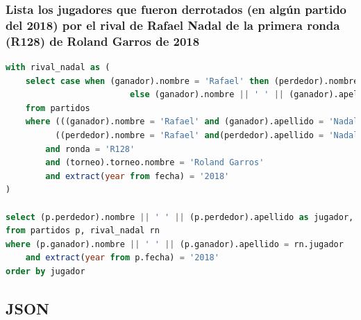 \documentclass[10pt]{opticajnl}
\begin{document}
\subsubsection{Lista los jugadores que fueron derrotados (en algún partido del 2018) por el rival de Rafael Nadal de la primera ronda (R128) de Roland Garros de 2018}

\begin{lstlisting}[language=SQL]
with rival_nadal as (
	select case when (ganador).nombre = 'Rafael' then (perdedor).nombre || ' ' || (perdedor).apellido 
						 else (ganador).nombre || ' ' || (ganador).apellido end as jugador
	from partidos 
	where (((ganador).nombre = 'Rafael' and (ganador).apellido = 'Nadal') or 
		  ((perdedor).nombre = 'Rafael' and(perdedor).apellido = 'Nadal'))
		and ronda = 'R128'
		and (torneo).torneo.nombre = 'Roland Garros'
		and extract(year from fecha) = '2018'
)

select (p.perdedor).nombre || ' ' || (p.perdedor).apellido as jugador, (p.perdedor).pais.codigo_iso2 as pais
from partidos p, rival_nadal rn
where (p.ganador).nombre || ' ' || (p.ganador).apellido = rn.jugador
	and extract(year from p.fecha) = '2018'
order by jugador
\end{lstlisting}


































\subsection{JSON}
\end{document}
